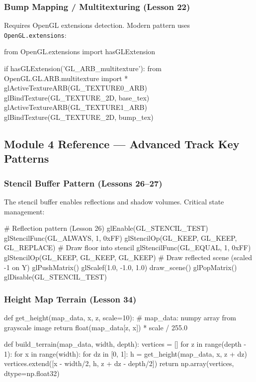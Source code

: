\documentclass[11pt,letterpaper]{article}
\begin{document}
\subsubsection{Bump Mapping / Multitexturing (Lesson 22)}

Requires OpenGL extensions detection. Modern pattern uses \texttt{OpenGL.extensions}:

\begin{codebox}
from OpenGL.extensions import hasGLExtension

if hasGLExtension('GL_ARB_multitexture'):
    from OpenGL.GL.ARB.multitexture import *
    glActiveTextureARB(GL_TEXTURE0_ARB)
    glBindTexture(GL_TEXTURE_2D, base_tex)
    glActiveTextureARB(GL_TEXTURE1_ARB)
    glBindTexture(GL_TEXTURE_2D, bump_tex)
\end{codebox}

\subsection{Module 4 Reference --- Advanced Track Key Patterns}

\subsubsection{Stencil Buffer Pattern (Lessons 26--27)}

The stencil buffer enables reflections and shadow volumes. Critical state management:

\begin{codebox}
# Reflection pattern (Lesson 26)
glEnable(GL_STENCIL_TEST)
glStencilFunc(GL_ALWAYS, 1, 0xFF)
glStencilOp(GL_KEEP, GL_KEEP, GL_REPLACE)
# Draw floor into stencil
glStencilFunc(GL_EQUAL, 1, 0xFF)
glStencilOp(GL_KEEP, GL_KEEP, GL_KEEP)
# Draw reflected scene (scaled -1 on Y)
glPushMatrix()
glScalef(1.0, -1.0, 1.0)
draw_scene()
glPopMatrix()
glDisable(GL_STENCIL_TEST)
\end{codebox}

\subsubsection{Height Map Terrain (Lesson 34)}

\begin{codebox}
def get_height(map_data, x, z, scale=10):
    # map_data: numpy array from grayscale image
    return float(map_data[z, x]) * scale / 255.0

def build_terrain(map_data, width, depth):
    vertices = []
    for z in range(depth - 1):
        for x in range(width):
            for dz in [0, 1]:
                h = get_height(map_data, x, z + dz)
                vertices.extend([x - width/2, h, z + dz - depth/2])
    return np.array(vertices, dtype=np.float32)
\end{codebox}
\end{document}
